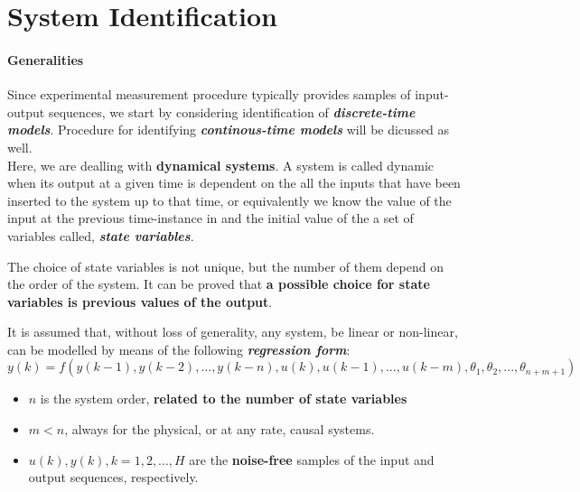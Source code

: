 \chapter{System Identification}    %
\subsubsection{Generalities}


Since experimental measurement procedure typically provides samples of input-output sequences, we start by considering identification of \textbf{\textit{discrete-time models}}. Procedure for identifying \textit{\textbf{continous-time models}} will be dicussed as well.\\
Here, we are dealling with \textbf{dynamical systems}. A system is called dynamic when its output at a given time is dependent on the all the inputs that have been inserted to the system up to that time, or equivalently we know the value of the input at the previous time-instance in and the initial value of the a set of variables called, \textbf{\textit{state variables}}.

The choice of state variables is not unique, but the number of them depend on the order of the system. It can be proved that \textbf{a possible choice for state variables is previous values of the output}.

It is assumed that, without loss of generality, any system, be linear or non-linear, can be modelled by means of the following \textit{\textbf{regression form}}:\\
\begin{equation}
y(k) = f(y(k-1), y(k-2), ..., y(k-n), u(k), u(k-1), ..., u(k-m), \theta_1, \theta_2, ..., \theta_{n+m+1})
\end{equation}
\begin{itemize}
\item \(n\) is the system order, \textbf{related to the number of state variables}
\item \(m < n\), always for the physical, or at any rate, causal systems.
\item \(u(k), y(k), k = 1, 2, ..., H\) are the \textbf{noise-free} samples of the input and output sequences, respectively.\\
\end{itemize}


